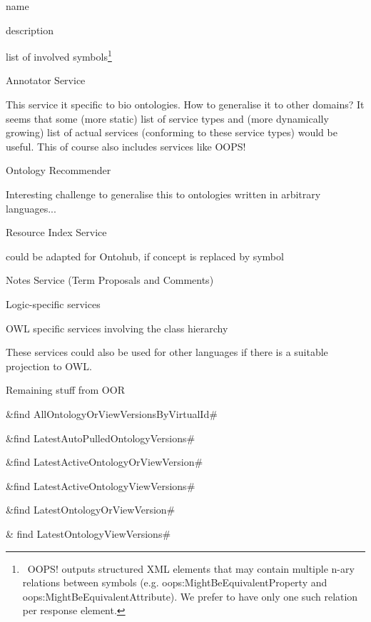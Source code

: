 \documentclass{article}
\begin{document}
name

description

list of involved symbols\footnote{\ OOPS! outputs structured XML
elements that may contain multiple n{}-ary relations between symbols
(e.g. oops:MightBeEquivalentProperty and
oops:MightBeEquivalentAttribute). We prefer to have only one such
relation per response element.}


\bigskip

Annotator Service


\bigskip

This service it specific to bio ontologies. How to generalise it to
other domains? It seems that some (more static) list of service types
and (more dynamically growing) list of actual services (conforming to
these service types) would be useful. This of course also includes
services like OOPS!


\bigskip

Ontology Recommender


\bigskip

Interesting challenge to generalise this to ontologies written in
arbitrary languages...


\bigskip

Resource Index Service


\bigskip

could be adapted for Ontohub, if {\textquotedbl}concept{\textquotedbl}
is replaced by {\textquotedbl}symbol{\textquotedbl}


\bigskip

Notes Service (Term Proposals and Comments)


\bigskip

Logic-specific services

OWL specific services involving the class hierarchy

These services could also be used for other languages if there is a
suitable projection to OWL.


\bigskip

Remaining stuff from OOR

&find AllOntologyOrViewVersionsByVirtualId\#

&find LatestAutoPulledOntologyVersions\#

&find LatestActiveOntologyOrViewVersion\#

&find LatestActiveOntologyViewVersions\#

&find LatestOntologyOrViewVersion\#

& find LatestOntologyViewVersions\#


\bigskip
\end{document}
